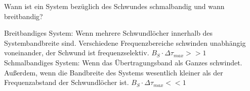 \begin{question}[section=13,name={Schwund},difficulty=,quantity=,type=thr,tags={}]
	Wann ist ein System bezüglich des Schwundes schmalbandig und wann breitbandig?
	
	
\end{question}
\begin{solution}
	Breitbandiges System: Wenn mehrere Schwundlöcher innerhalb des Systembandbreite sind. Verschiedene Frequenzbereiche schwinden unabhängig voneinander, der Schwund ist frequenzselektiv. $B_S \cdot \Delta \tau_{max} >> 1$\\
	Schmalbandiges System: Wenn das Übertragungsband als Ganzes schwindet. Außerdem, wenn die Bandbreite des Systems wesentlich kleiner als der Frequenzabstand der Schwundlöcher ist. $B_S \cdot \Delta \tau_{max} << 1$
\end{solution}